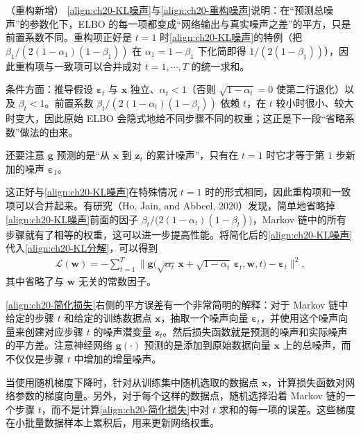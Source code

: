 \documentclass[../../main.tex]{subfiles}
\begin{document}
\begin{remark}（重构新增）
\eqref{align:ch20-KL噪声}与\eqref{align:ch20-重构噪声}说明：在“预测总噪声”的参数化下，ELBO 的每一项都变成“网络输出与真实噪声之差”的平方，只是前置系数不同。重构项正好是 $t=1$ 时\eqref{align:ch20-KL噪声}的特例（把 $\beta_1/(2(1-\alpha_1)(1-\beta_1))$ 在 $\alpha_1=1-\beta_1$ 下化简即得 $1/(2(1-\beta_1))$），因此重构项与一致项可以合并成对 $t=1,\cdots,T$ 的统一求和。\par
条件方面：推导假设 $\bm{\varepsilon}_t$ 与 $\bm{x}$ 独立、$\alpha_t<1$（否则 $\sqrt{1-\alpha_t}=0$ 使第二行退化）以及 $\beta_t<1$。前置系数 $\beta_t/(2(1-\alpha_t)(1-\beta_t))$ 依赖 $t$，在 $t$ 较小时很小、较大时变大，因此原始 ELBO 会隐式地给不同步骤不同的权重；这正是下一段“省略系数”做法的由来。\par
还要注意 $\bm{g}$ 预测的是“从 $\bm{x}$ 到 $\bm{z}_t$ 的累计噪声”，只有在 $t=1$ 时它才等于第 $1$ 步新加的噪声 $\bm{\varepsilon}_1$。
\end{remark}

这正好与\eqref{align:ch20-KL噪声}在特殊情况 $t=1$ 时的形式相同，因此重构项和一致项可以合并起来。有研究（Ho, Jain, and Abbeel, 2020）发现，简单地省略掉\eqref{align:ch20-KL噪声}前面的因子 $\beta_t/\big(2(1-\alpha_t)(1-\beta_t)\big)$，Markov 链中的所有步骤就有了相等的权重，这可以进一步提高性能。将简化后的\eqref{align:ch20-KL噪声}代入\eqref{align:ch20-KL分解}，可以得到
\begin{align}
\mathcal{L}(\bm{w})=-\sum_{t=1}^{T}\big\|\bm{g}\big(\sqrt{\alpha_t}\,\bm{x}+\sqrt{1-\alpha_t}\,\bm{\varepsilon}_t,\bm{w},t\big)-\bm{\varepsilon}_t\big\|^2,
\label{align:ch20-简化损失}
\end{align}
其中省略了与 $\bm{w}$ 无关的常数因子。

\eqref{align:ch20-简化损失}右侧的平方误差有一个非常简明的解释：对于 Markov 链中给定的步骤 $t$ 和给定的训练数据点 $\bm{x}$，抽取一个噪声向量 $\bm{\varepsilon}_t$，并使用这个噪声向量来创建对应步骤 $t$ 的噪声潜变量 $\bm{z}_t$。然后损失函数就是预测的噪声和实际噪声的平方差。注意神经网络 $\bm{g}(\cdot)$ 预测的是添加到原始数据向量 $\bm{x}$ 上的总噪声，而不仅仅是步骤 $t$ 中增加的增量噪声。

当使用随机梯度下降时，针对从训练集中随机选取的数据点 $\bm{x}$，计算损失函数对网络参数的梯度向量。另外，对于每个这样的数据点，随机选择沿着 Markov 链的一个步骤 $t$，而不是计算\eqref{align:ch20-简化损失}中对 $t$ 求和的每一项的误差。这些梯度在小批量数据样本上累积后，用来更新网络权重。
\end{document}

